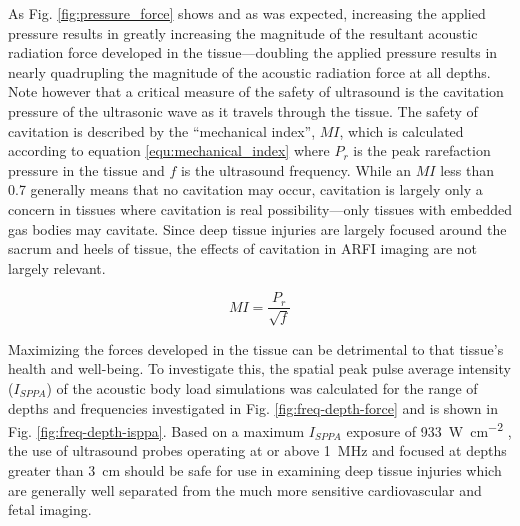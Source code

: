 			As Fig. \ref{fig:pressure_force} shows and as was expected, increasing the applied pressure results in greatly increasing the magnitude of the resultant acoustic radiation force developed in the tissue---doubling the applied pressure results in nearly quadrupling the magnitude of the acoustic radiation force at all depths. Note however that a critical measure of the safety of ultrasound is the cavitation pressure of the ultrasonic wave as it travels through the tissue. The safety of cavitation is described by the ``mechanical index'', $MI$, which is calculated according to equation \ref{equ:mechanical_index} \cite{hoskins10} where $P_r$ is the peak rarefaction pressure in the tissue and $f$ is the ultrasound frequency. While an $MI$ less than 0.7 generally means that no cavitation may occur, cavitation is largely only a concern in tissues where cavitation is real possibility---only tissues with embedded gas bodies may cavitate. Since deep tissue injuries are largely focused around the sacrum and heels of tissue, the effects of cavitation in ARFI imaging are not largely relevant.

			\begin{equation}
			\label{equ:mechanical_index}
				MI = \frac{P_r}{\sqrt{f}}
			\end{equation}

			Maximizing the forces developed in the tissue can be detrimental to that tissue's health and well-being. To investigate this, the spatial peak pulse average intensity ($I_{SPPA}$) of the acoustic body load simulations was calculated for the range of depths and frequencies investigated in Fig. \ref{fig:freq-depth-force} and is shown in Fig. \ref{fig:freq-depth-isppa}. Based on a maximum $I_{SPPA}$ exposure of \SI{933}{\W\per\cm\squared} \cite{hoskins10}, the use of ultrasound probes operating at or above \SI{1}{\MHz} and focused at depths greater than \SI{3}{\cm} should be safe for use in examining deep tissue injuries which are generally well separated from the much more sensitive cardiovascular and fetal imaging.

